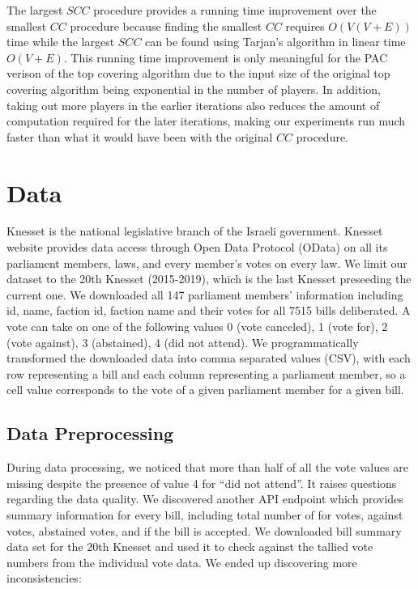 \documentclass[letterpaper]{article} %
\begin{document}
The largest $SCC$ procedure provides a running time improvement over the smallest $CC$ procedure because finding the smallest $CC$ requires $O(V(V + E))$ time while the largest $SCC$ can be found using Tarjan's algorithm in linear time $O(V + E)$\cite{Tarjan72depthfirst}. This running time improvement is only meaningful for the PAC verison of the top covering algorithm due to the input size of the original top covering algorithm being exponential in the number of players. In addition, taking out more players in the earlier iterations also reduces the amount of computation required for the later iterations, making our experiments run much faster than what it would have been with the original $CC$ procedure.

\section{Data}
Knesset is the national legislative branch of the Israeli government. Knesset website provides data access through Open Data Protocol (OData) on all its parliament members, laws, and every member's votes on every law. We limit our dataset to the 20th Knesset (2015-2019), which is the last Knesset preseeding the current one. We downloaded all 147 parliament members' information including id, name, faction id, faction name and their votes for all 7515 bills deliberated. A vote can take on one of the following values 0 (vote canceled), 1 (vote for), 2 (vote against), 3 (abstained), 4 (did not attend). We programmatically transformed the downloaded data into comma separated values (CSV), with each row representing a bill and each column representing a parliament member, so a cell value corresponds to the vote of a given parliament member for a given bill.

\subsection{Data Preprocessing}
During data processing, we noticed that more than half of all the vote values are missing despite the presence of value 4 for ``did not attend''. It raises questions regarding the data quality. We discovered another API endpoint which provides summary information for every bill, including total number of for votes, against votes, abstained votes, and if the bill is accepted. We downloaded bill summary data set for the 20th Knesset and used it to check against the tallied vote numbers from the individual vote data. We ended up discovering more inconsistencies:
\end{document}
